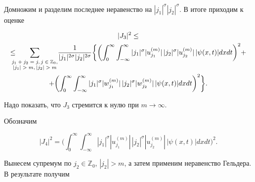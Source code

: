 Домножим и разделим последнее неравенство на $|j_1|^{\sigma} |j_2|^{\sigma}$. В итоге приходим к оценке

\begin{multline*}

|J_3|^2\le 

\\

\le \!\!\!\!\!\!\!\!

\sum_{

\scriptsize

\begin{array}{c}

j_1+j_2=j,j\in \mathbb Z_0, \\ |j_1|>m, |j_2|> m

\end{array}

} \!\!\!\! \frac1{|j_1|^{2\sigma}|j_2|^{2\sigma}}

\biggl\{ 

\biggl( \int_0^\infty \int_{-\infty}^\infty |j_1|^{\sigma} |u_{j_1}^{(m)}|\, |j_2|^{\sigma} |u_{j_2}^{(m)}|\, |\psi(x,t)| dxdt\biggr)^2+

\\

+ \biggl(\int_0^\infty \int_{-\infty}^\infty |j_1|^{\sigma}  |w_{j_1}^{(m)}| \, |j_2|^{\sigma} |w_{j_2}^{(m)}| \,|\psi(x,t)| dxdt\biggr)^2 \biggr\}.

\end{multline*}

Надо показать, что $J_3$ стремится к нулю при $m\to \infty$.

Обозначим 

$$

|J_4|^2=\biggl(\int_0^\infty \int_{-\infty}^\infty |j_1|^{\sigma} |u_{j_1}^{(m)}| \, |j_2|^{\sigma} |u_{j_2}^{(m)}| \, |\psi(x,t)| dxdt\biggr)^2.

$$

Вынесем супремум по $j_2\in \mathbb Z_0$, $|j_2|> m$, а затем применим неравенство Гельдера. В результате получим

